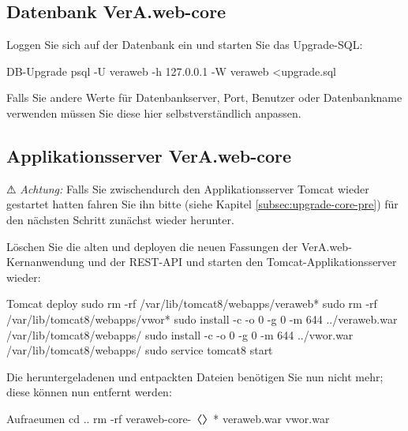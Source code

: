 \fi%

\subsection{Datenbank VerA.web-core}\label{subsec:upgrade-core-db}

\begin{minipage}{\linewidth}
Loggen Sie sich auf der Datenbank ein und starten Sie das Upgrade-SQL:

\begin{lstdump}{DB-Upgrade}
psql -U veraweb -h 127.0.0.1 -W veraweb <upgrade.sql
\end{lstdump}

Falls Sie andere Werte für Datenbankserver, Port, Benutzer oder Datenbankname
verwenden müssen Sie diese hier selbstverständlich anpassen.
\end{minipage}

\subsection{Applikationsserver VerA.web-core}\label{subsec:upgrade-core-tomcat}

⚠ \emph{Achtung:} Falls Sie zwischendurch den Applikationsserver
Tomcat wieder gestartet hatten fahren Sie ihn bitte (siehe Kapitel
\ref{subsec:upgrade-core-pre}) für den nächsten Schritt zunächst
wieder herunter.

\begin{minipage}{\linewidth}
Löschen Sie die alten und deployen die neuen Fassungen der
VerA.web-Kernanwendung und der REST-API und starten den
Tomcat-Applikationsserver wieder:

\begin{lstdump}{Tomcat deploy}
sudo rm -rf /var/lib/tomcat8/webapps/veraweb*
sudo rm -rf /var/lib/tomcat8/webapps/vwor*
sudo install -c -o 0 -g 0 -m 644 ../veraweb.war /var/lib/tomcat8/webapps/
sudo install -c -o 0 -g 0 -m 644 ../vwor.war /var/lib/tomcat8/webapps/
sudo service tomcat8 start
\end{lstdump}
\end{minipage}

\begin{minipage}{\linewidth}
Die heruntergeladenen und entpackten Dateien benötigen Sie nun nicht
mehr; diese können nun entfernt werden:

\begin{lstdump}{Aufraeumen}
cd ..
rm -rf veraweb-core-〈\lstdumpesc{\vwiaverssw}〉* veraweb.war vwor.war
\end{lstdump}
\end{minipage}

